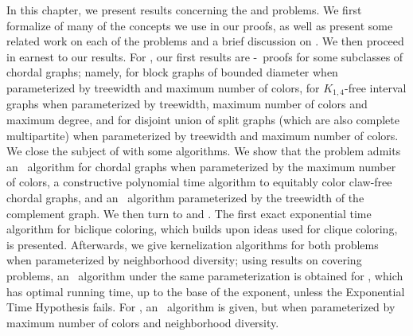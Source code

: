 In this chapter, we present results concerning the  and  problems.
We first formalize of many of the concepts we use in our proofs, as well as present some related work on each of the problems and a brief discussion on .
We then proceed in earnest to our results.
For , our first results are \W[1]-\Hness\ proofs for some subclasses of chordal graphs; namely, for block graphs of bounded diameter when parameterized by treewidth and maximum number of colors, for $K_{1,4}$-free interval graphs when parameterized by treewidth, maximum number of colors and maximum degree, and for disjoint union of split graphs (which are also complete multipartite) when parameterized by treewidth and maximum number of colors.
We close the subject of  with some algorithms.
We show that the problem admits an \XP\ algorithm for chordal graphs when parameterized by the maximum number of colors, a constructive polynomial time algorithm to equitably color claw-free chordal graphs, and an \FPT\ algorithm parameterized by the treewidth of the complement graph.
We then turn to  and .
The first exact exponential time algorithm for biclique coloring, which builds upon ideas used for clique coloring, is presented.
Afterwards, we give kernelization algorithms for both problems when parameterized by neighborhood diversity; using results on covering problems, an \FPT\ algorithm under the same parameterization is obtained for , which has optimal running time, up to the base of the exponent, unless the Exponential Time Hypothesis fails.
For , an \FPT\ algorithm is given, but when parameterized by maximum number of colors and neighborhood diversity.









